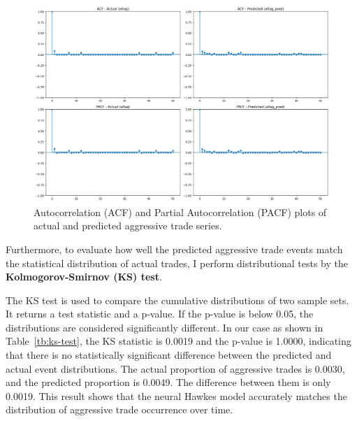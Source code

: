 
\begin{figure}[H]
    \centering
    \includegraphics[width=0.95\linewidth]{figures/ACF_181330.png}
    \caption{Autocorrelation (ACF) and Partial Autocorrelation (PACF) plots of actual and predicted aggressive trade series.}
    \label{fig:acf-pacf}
\end{figure}



Furthermore, to evaluate how well the predicted aggressive trade events match the statistical distribution of actual trades, I perform distributional tests by the \textbf{Kolmogorov-Smirnov (KS) test}. 

The KS test is used to compare the cumulative distributions of two sample sets. It returns a test statistic and a p-value. If the p-value is below 0.05, the distributions are considered significantly different. In our case as shown in Table~\ref{tb:ks-test}, the KS statistic is 0.0019 and the p-value is 1.0000, indicating that there is no statistically significant difference between the predicted and actual event distributions. The actual proportion of aggressive trades is 0.0030, and the predicted proportion is 0.0049. The difference between them is only 0.0019. This result shows that the neural Hawkes model accurately matches the distribution of aggressive trade occurrence over time.

